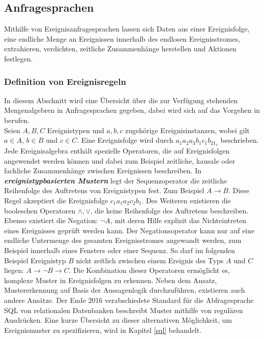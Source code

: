 \documentclass{acm_proc_article-sp}
\begin{document}
%
%
\subsection{Anfragesprachen}\label{kap:anfragesprachen}
\vspace{0.1cm}
Mithilfe von Ereignisanfragesprachen lassen sich Daten aus einer Ereignisfolge, eine 
endliche Menge an Ereignissen innerhalb des endlosen Ereignisstromes, extrahieren, 
verdichten, zeitliche Zusammenhänge herstellen und Aktionen festlegen.

\subsubsection{Definition von Ereignisregeln}\label{kap:ereignisregeln}
\vspace{0.1cm}
In diesem Abschnitt wird eine Übersicht über die zur Verfügung stehenden Mengenalgebren 
in Anfragesprachen gegeben, dabei wird sich auf das Vorgehen in \cite{bruns} berufen.\\
Seien $A,B,C$ Ereignistypen und $a,b,c$ zugehörige Ereignisinstanzen, wobei gilt 
$a \in A$, $b \in B$ und $c \in C$. Eine Ereignisfolge wird durch $a_1a_2a_3b_1c_1b_21_4$
beschrieben.\\
Jede Ereignisalgebra enthält spezielle Operatoren, die auf Ereignisfolgen angewendet 
werden können und dabei zum Beispiel zeitliche, kausale oder fachliche Zusammenhänge 
zwischen 
Ereignissen beschreiben. In \textbf{\textit{ereignistypbasierten Mustern}} legt der 
Sequenzoperator die zeitliche Reihenfolge des Auftretens von Ereignistypen fest. Zum 
Beispiel $A \rightarrow B$. Diese Regel akzeptiert die Ereignisfolge $c_1a_1a_2c_2b_1$. 
Des Weiteren existieren die booleschen Operatoren $\land , \lor$, die keine Reihenfolge 
des Auftretens beschreiben. Ebenso existiert die Negation: $\neg A$, mit deren Hilfe 
explizit das Nichteintreten eines Ereignisses geprüft werden kann. Der 
Negationsoperator kann nur auf eine endliche Untermenge des gesamten Ereignisstromes 
angewandt werden, zum Beispiel innerhalb eines Fensters oder einer Sequenz. So darf im 
folgenden Beispiel Ereignistyp $B$ nicht zeitlich zwischen einem Ereignis des Typs $A$ 
und $C$ liegen: $A\rightarrow\lnot B\rightarrow C$. 
Die Kombination dieser Operatoren ermöglicht es, komplexe Muster in Ereignisfolgen zu 
erkennen. Neben dem Ansatz, Mustererkennung auf Basis der Aussagenlogik durchzuführen, 
existieren auch andere Ansätze. Der Ende 2016 verabschiedete Standard \cite{sql-2016} 
für die Abfragesprache SQL von relationalen Datenbanken beschreibt Muster mithilfe von 
regulären Ausdrücken. Eine kurze Übersicht zu dieser alternativen Möglichkeit, um 
Ereignismuster zu spezifizieren, wird in Kapitel \ref{sql} behandelt.
\end{document}
